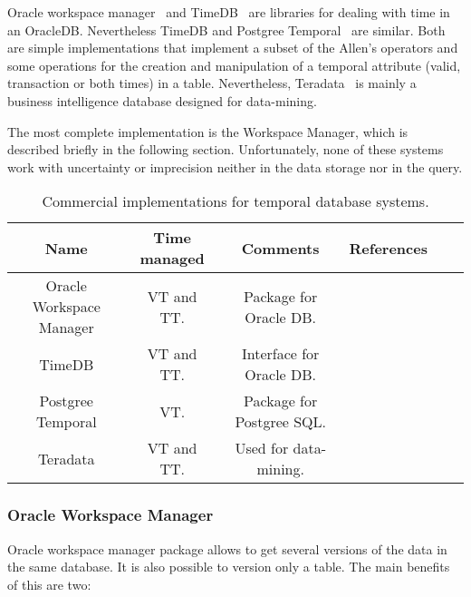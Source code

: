 Oracle workspace manager~\cite{oracle2009} and TimeDB~\cite{timedb2005} are libraries for dealing with time in an OracleDB. Nevertheless TimeDB and Postgree Temporal~\cite{posgree2009} are similar. Both are simple implementations that implement a subset of the Allen's operators and some operations for the creation and manipulation of a temporal attribute (valid, transaction or both times) in a table. Nevertheless, Teradata~\cite{teradata2011} is mainly a business intelligence database designed for data-mining. 

The most complete implementation is the Workspace Manager, which is described briefly in the following section. Unfortunately, none of these systems work with uncertainty or imprecision neither in the data storage nor in the query.

\begin{table}
\centering
\caption{Commercial implementations for temporal database systems. }
\begin{tabular}{c c c c c c }
\hline
\textbf{Name} & \textbf{Time managed} & \textbf{Comments} & \textbf{References}  \\ \hline
Oracle Workspace Manager & VT and TT. & Package for Oracle DB. & \cite{oracle2009}\\
TimeDB & VT and TT. & Interface for Oracle DB. & \cite{timedb2005}\\
Postgree Temporal & VT. & Package for Postgree SQL. & \cite{posgree2009}\\
Teradata & VT and TT. & Used for data-mining. & \cite{teradata2011}\\
\hline 
\end{tabular}
\label{table:commercial-temporal-db}



\end{table}

\subsubsection{Oracle Workspace Manager}


Oracle workspace manager \cite{OraE118602} package allows to get several versions of the data in the same database. It is also possible to version only a table. The main benefits of this are two:

